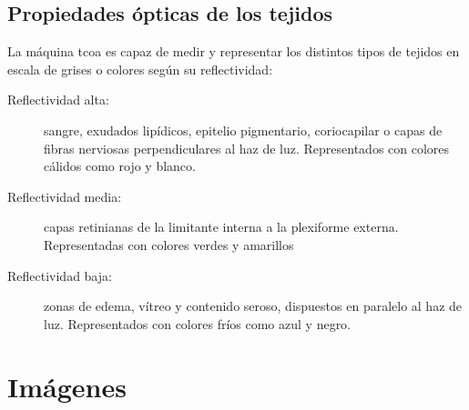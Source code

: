 \subsection{Propiedades ópticas de los tejidos}
La máquina \gls{tcoa} es capaz de medir y representar los distintos
tipos de tejidos en escala de grises o colores según su reflectividad:
\begin{description}
\item[Reflectividad alta:] sangre, exudados lipídicos, epitelio pigmentario,
coriocapilar o capas de fibras nerviosas perpendiculares al haz de
luz. Representados con colores cálidos como rojo y blanco.
\item[Reflectividad media:] capas retinianas de la limitante interna a la
plexiforme externa. Representadas con colores verdes y amarillos
\item[Reflectividad baja:] zonas de edema, vítreo y contenido seroso,
dispuestos en paralelo al haz de luz. Representados con colores fríos
como azul y negro.
\end{description}
\section{Imágenes }